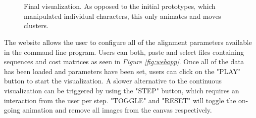 \documentclass[twoside,openright,titlepage,numbers=noenddot,headinclude,%
                footinclude=true,cleardoublepage=empty,abstractoff, %
                BCOR=5mm,paper=a4,fontsize=11pt,%
                ngerman,american,%
                ]{scrreprt}
\begin{document}
\begin{figure}[h]%
    \centering
    \label{fig:anim-align-final}
    
    \\
    
    
    \\
    
    \caption{Final visualization. As opposed to the initial prototypes, which manipulated individual characters, this only animates and moves clusters.}
    
\end{figure}

The website allows the user to configure all of the alignment parameters available in the command line program. Users can both, paste and select files containing sequences and cost matrices as seen in \textit{Figure \ref{fig:webapp}}. Once all of the data has been loaded and parameters have been set, users can click on the "PLAY" button to start the visualization. A slower alternative to the continuous visualization can be triggered by using the "STEP" button, which requires an interaction from the user per step. "TOGGLE" and "RESET" will toggle the on-going animation and remove all images from the canvas respectively.
\end{document}
